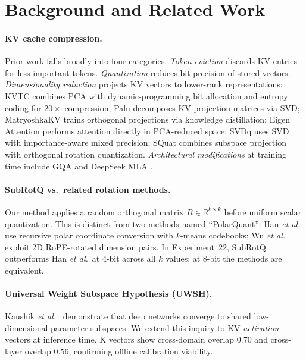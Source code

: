 \documentclass{article}
\newcommand{\etal}{\textit{et al.}}
\begin{document}
\section{Background and Related Work}
\label{sec:background}

\paragraph{KV cache compression.}
Prior work falls broadly into four categories. \emph{Token eviction}
\cite{zhang2023h2o, xiao2024streamingllm} discards KV entries for less important
tokens. \emph{Quantization} \cite{hooper2024kvquant, liu2024kivi, kang2024gear}
reduces bit precision of stored vectors. \emph{Dimensionality reduction} projects
KV vectors to lower-rank representations: KVTC \cite{staniszewski2025kvtc}
combines PCA with dynamic-programming bit allocation and entropy coding for
$20{\times}$ compression; Palu \cite{chang2025palu} decomposes KV projection matrices
via SVD; MatryoshkaKV \cite{park2025matryoshka} trains orthogonal projections via
knowledge distillation; Eigen Attention \cite{yang2024eigen} performs attention
directly in PCA-reduced space; SVDq \cite{wu2025svdq} uses SVD with
importance-aware mixed precision; SQuat \cite{li2025squat} combines subspace
projection with orthogonal rotation quantization. \emph{Architectural
modifications} at training time include GQA \cite{ainslie2023gqa} and DeepSeek
MLA \cite{deepseek2024}.

\paragraph{SubRotQ vs.\ related rotation methods.}
Our method applies a random orthogonal matrix $R \in \mathbb{R}^{k \times k}$
before uniform scalar quantization. This is distinct from two methods named
``PolarQuant'': Han \etal~\cite{han2025polarquant} use recursive polar coordinate
conversion with $k$-means codebooks; Wu \etal~\cite{wu2025polarquant2} exploit
2D RoPE-rotated dimension pairs. In Experiment~22, SubRotQ outperforms Han \etal\
at 4-bit across all $k$ values; at 8-bit the methods are equivalent.

\paragraph{Universal Weight Subspace Hypothesis (UWSH).}
Kaushik \etal~\cite{kaushik2025uwsh} demonstrate that deep networks converge to
shared low-dimensional parameter subspaces. We extend this inquiry to KV
\emph{activation} vectors at inference time. K vectors show cross-domain overlap
$0.70$ and cross-layer overlap $0.56$, confirming offline calibration viability.
\end{document}

